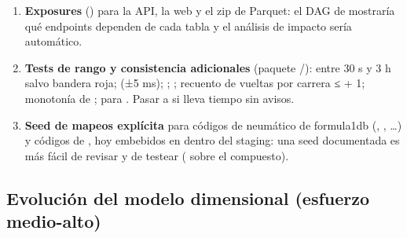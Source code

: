 \begin{enumerate}
\begin{itemize}
\end{itemize}
\item \textbf{Exposures} () para la API, la web y el zip de Parquet: el DAG de  mostraría qué endpoints dependen de cada tabla y el análisis de impacto sería automático.
\item \textbf{Tests de rango y consistencia adicionales} (paquete /):  entre 30 s y 3 h salvo bandera roja;  (±5 ms); ; ; recuento de vueltas por carrera ≤  + 1; monotonía de ;  para . Pasar  a  si lleva tiempo sin avisos.
\item \textbf{Seed de mapeos explícita} para códigos de neumático de formula1db (, , …) y códigos de , hoy embebidos en  dentro del staging: una seed documentada es más fácil de revisar y de testear ( sobre el compuesto).
\end{enumerate}

\subsection{Evolución del modelo dimensional (esfuerzo medio-alto)}

